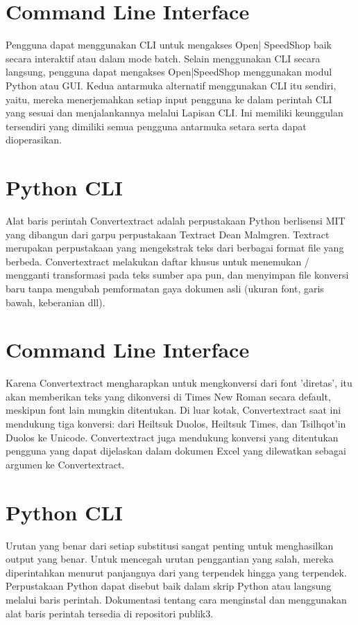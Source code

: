 \documentclass[12pt, times new roman, a4paper]{article}
\begin{document}
\section{Command Line Interface}
Pengguna dapat menggunakan CLI untuk mengakses Open| SpeedShop baik secara interaktif atau dalam mode batch. Selain menggunakan CLI secara langsung, pengguna dapat mengakses Open|SpeedShop menggunakan modul Python atau GUI. Kedua antarmuka alternatif menggunakan CLI itu sendiri, yaitu, mereka menerjemahkan setiap input pengguna ke dalam perintah CLI yang sesuai dan menjalankannya melalui Lapisan CLI. Ini memiliki keunggulan tersendiri yang dimiliki semua pengguna antarmuka setara serta dapat dioperasikan.

\section{Python CLI}
Alat baris perintah Convertextract adalah perpustakaan Python berlisensi MIT yang dibangun dari garpu perpustakaan Textract Dean Malmgren. Textract merupakan perpustakaan yang mengekstrak teks dari berbagai format file yang berbeda. Convertextract melakukan daftar khusus untuk menemukan / mengganti transformasi pada teks sumber apa pun, dan menyimpan file konversi baru tanpa mengubah pemformatan gaya dokumen asli (ukuran font, garis bawah, keberanian dll).

\section{Command Line Interface}
Karena Convertextract mengharapkan untuk mengkonversi dari font 'diretas', itu akan memberikan teks yang dikonversi di Times New Roman secara default, meskipun font lain mungkin ditentukan. Di luar kotak, Convertextract saat ini mendukung tiga konversi: dari Heiltsuk Duolos, Heiltsuk Times, dan Tsilhqot’in Duolos ke Unicode. Convertextract juga mendukung konversi yang ditentukan pengguna yang dapat dijelaskan dalam dokumen Excel yang dilewatkan sebagai argumen ke Convertextract.

\section{Python CLI}
Urutan yang benar dari setiap substitusi sangat penting untuk menghasilkan output yang benar. Untuk mencegah urutan penggantian yang salah, mereka diperintahkan menurut panjangnya dari yang terpendek hingga yang terpendek. Perpustakaan Python dapat disebut baik dalam skrip Python atau langsung melalui baris perintah. Dokumentasi tentang cara menginstal dan menggunakan alat baris perintah tersedia di repositori publik3. 
\end{document}
